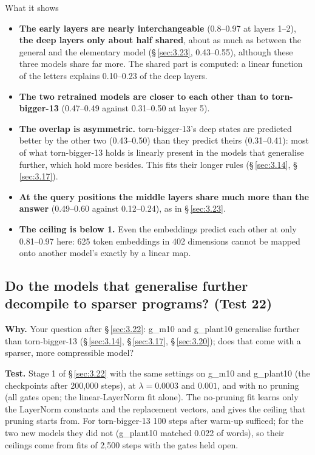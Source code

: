 \documentclass[paper=a4,fontsize=11pt,DIV=11,parskip=half,headings=small,numbers=noendperiod]{scrartcl}
\DeclareRobustCommand{\lead}[1]{\textsf{\bfseries\color{accent}#1}}
\DeclareRobustCommand{\code}[1]{{\fontseries{m}\ttfamily #1}}
\begin{document}
\begin{findbox}{What it shows}
\begin{itemize}
\item \lead{The early layers are nearly interchangeable} (0.8–0.97 at layers 1–2), \textbf{the deep layers only
  about half shared}, about as much as between the general and the elementary model (\S\,\ref{sec:3.23},
  0.43–0.55), although these three models share far more. The shared part is computed: a linear function of the
  letters explains 0.10–0.23 of the deep layers.
\item \lead{The two retrained models are closer to each other than to
  \code{torn-\allowbreak{}bigger-\allowbreak{}13}} (0.47–0.49 against 0.31–0.50 at layer 5).
\item \lead{The overlap is asymmetric.} \code{torn-\allowbreak{}bigger-\allowbreak{}13}’s deep states are
  predicted better by the other two (0.43–0.50) than they predict theirs (0.31–0.41): most of what
  \code{torn-\allowbreak{}bigger-\allowbreak{}13} holds is linearly present in the models that generalise
  further, which hold more besides. This fits their longer rules (\S\,\ref{sec:3.14}, \S\,\ref{sec:3.17}).
\item \lead{At the query positions the middle layers share much more than the answer} (0.49–0.60 against
  0.12–0.24), as in \S\,\ref{sec:3.23}.
\item \lead{The ceiling is below 1.} Even the embeddings predict each other at only 0.81–0.97 here: 625 token
  embeddings in 402 dimensions cannot be mapped onto another model’s exactly by a linear map.
\end{itemize}
\end{findbox}

\subsection{Do the models that generalise further decompile to sparser programs? (Test 22)}\label{sec:3.26}
\lead{Why.} Your question after \S\,\ref{sec:3.22}: \code{g\_\allowbreak{}m10} and
\code{g\_\allowbreak{}plant10} generalise further than \code{torn-\allowbreak{}bigger-\allowbreak{}13}
(\S\,\ref{sec:3.14}, \S\,\ref{sec:3.17}, \S\,\ref{sec:3.20}); does that come with a sparser, more compressible
model?

\lead{Test.} Stage 1 of \S\,\ref{sec:3.22} with the same settings on \code{g\_\allowbreak{}m10} and
\code{g\_\allowbreak{}plant10} (the checkpoints after 200,000 steps), at $\lambda=0.0003$ and $0.001$, and with
no pruning (all gates open; the linear-LayerNorm fit alone). The no-pruning fit learns only the LayerNorm
constants and the replacement vectors, and gives the ceiling that pruning starts from. For
\code{torn-\allowbreak{}bigger-\allowbreak{}13} 100 steps after warm-up sufficed; for the two new models they
did not (\code{g\_\allowbreak{}plant10} matched 0.022 of words), so their ceilings come from fits of 2,500 steps
with the gates held open.
\end{document}
